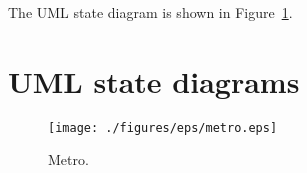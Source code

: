\documentclass[12pt]{article}
\begin{document}
\begin{spacing}{1.5}
\noindent The UML state diagram is shown in Figure~\ref{fig:metro-fig}.

\newpage

\section{UML state diagrams}

\begin{figure}[h!]
	\centering
		\texttt{[image: ./figures/eps/metro.eps]}
		  \caption{Metro.}
  \label{fig:metro-fig}
\end{figure}

\end{spacing}
\end{document}
